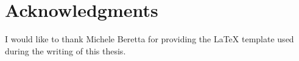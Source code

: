 \section{Acknowledgments}

I would like to thank Michele Beretta for providing the LaTeX template used during the writing of this thesis.
